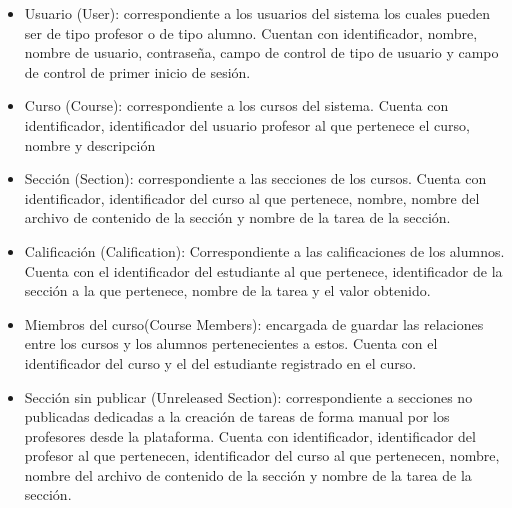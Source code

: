 \begin{itemize}
\item Usuario (User): correspondiente a los usuarios del sistema los cuales pueden ser de tipo profesor o de tipo alumno. Cuentan con identificador, nombre, nombre de usuario, contraseña, campo de control de tipo de usuario y campo de control de primer inicio de sesión.

\item Curso (Course): correspondiente a los cursos del sistema. Cuenta con identificador, identificador del usuario profesor al que pertenece el curso, nombre y descripción 

\item Sección (Section): correspondiente a las secciones de los cursos. Cuenta con identificador, identificador del curso al que pertenece, nombre, nombre del archivo de contenido de la sección y nombre de la tarea de la sección.

\item Calificación (Calification): Correspondiente a las calificaciones de los alumnos. Cuenta con el identificador del estudiante al que pertenece, identificador de la sección a la que pertenece, nombre de la tarea y el valor obtenido.

\item Miembros del curso(Course Members): encargada de guardar las relaciones entre los cursos y los alumnos pertenecientes a estos. Cuenta con el identificador del curso y el del estudiante registrado en el curso.

\item Sección sin publicar (Unreleased Section): correspondiente a secciones no publicadas dedicadas a la creación de tareas de forma manual por los profesores desde la plataforma. Cuenta con identificador, identificador del profesor al que pertenecen, identificador del curso al que pertenecen, nombre, nombre del archivo de contenido de la sección y nombre de la tarea de la sección.



\end{itemize}
